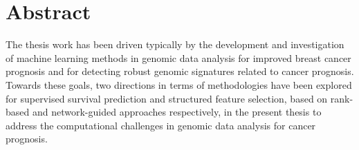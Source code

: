 \section*{\Huge Abstract}
\vskip 1cm

The thesis work has been driven typically by the development and investigation of machine learning methods in genomic data analysis for improved breast cancer prognosis and for detecting robust genomic signatures related to cancer prognosis. Towards these goals, two directions in terms of methodologies have been explored for supervised survival prediction and structured feature selection, based on rank-based and network-guided approaches respectively, in the present thesis to address the computational challenges in genomic data analysis for cancer prognosis.